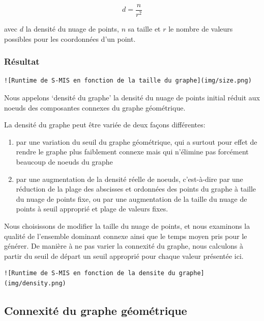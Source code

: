 \documentclass[]{report}
\providecommand{\tightlist}{%
  \setlength{\itemsep}{0pt}\setlength{\parskip}{0pt}}
\begin{document}
\[ d = \frac{n}{r^2}\]

avec \(d\) la densité du nuage de points, \(n\) sa taille et \(r\) le
nombre de valeurs possibles pour les coordonnées d'un point.

\subsubsection{Résultat}\label{ruxe9sultat}

\begin{lstlisting}
![Runtime de S-MIS en fonction de la taille du graphe](img/size.png)
\end{lstlisting}

Nous appelons `densité du graphe' la densité du nuage de points initial
réduit aux noeuds des composantes connexes du graphe géométrique.

La densité du graphe peut être variée de deux façons différentes:

\begin{enumerate}
\def\labelenumi{\arabic{enumi}.}
\tightlist
\item
  par une variation du seuil du graphe géométrique, qui a surtout pour
  effet de rendre le graphe plus faiblement connexe mais qui n'élimine
  pas forcément beaucoup de noeuds du graphe
\item
  par une augmentation de la densité réelle de noeuds, c'est-à-dire par
  une réduction de la plage des abscisses et ordonnées des points du
  graphe à taille du nuage de points fixe, ou par une augmentation de la
  taille du nuage de points à seuil approprié et plage de valeurs fixes.
\end{enumerate}

Nous choisissons de modifier la taille du nuage de points, et nous
examinons la qualité de l'ensemble dominant connexe ainsi que le temps
moyen pris pour le générer. De manière à ne pas varier la connexité du
graphe, nous calculons à partir du seuil de départ un seuil approprié
pour chaque valeur présentée ici.

\begin{lstlisting}
![Runtime de S-MIS en fonction de la densite du graphe](img/density.png)
\end{lstlisting}

\subsection{Connexité du graphe
géométrique}\label{connexituxe9-du-graphe-guxe9omuxe9trique}
\end{document}
